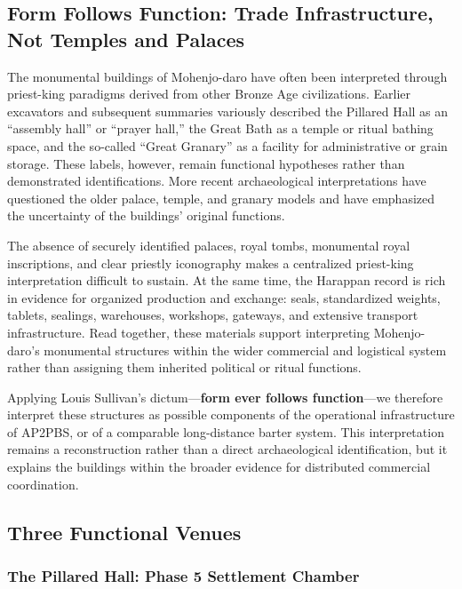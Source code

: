 \documentclass[12pt]{article}
\begin{document}
\subsection{Form Follows Function: Trade Infrastructure, Not Temples and Palaces}

The monumental buildings of Mohenjo-daro have often been interpreted through
priest-king paradigms derived from other Bronze Age civilizations. Earlier
excavators and subsequent summaries variously described the Pillared Hall as an
``assembly hall'' or ``prayer hall,'' the Great Bath as a temple or ritual
bathing space, and the so-called ``Great Granary'' as a facility for
administrative or grain storage. These labels, however, remain functional
hypotheses rather than demonstrated identifications. More recent archaeological
interpretations have questioned the older palace, temple, and granary models
and have emphasized the uncertainty of the buildings' original functions.

The absence of securely identified palaces, royal tombs, monumental royal
inscriptions, and clear priestly iconography makes a centralized priest-king
interpretation difficult to sustain. At the same time, the Harappan record is
rich in evidence for organized production and exchange: seals, standardized
weights, tablets, sealings, warehouses, workshops, gateways, and extensive
transport infrastructure. Read together, these materials support interpreting
Mohenjo-daro's monumental structures within the wider commercial and logistical
system rather than assigning them inherited political or ritual functions.

Applying Louis Sullivan's dictum---\textbf{form ever follows function}---we
therefore interpret these structures as possible components of the operational
infrastructure of AP2PBS, or of a comparable long-distance barter system. This
interpretation remains a reconstruction rather than a direct archaeological
identification, but it explains the buildings within the broader evidence for
distributed commercial coordination.

\subsection{Three Functional Venues}

\subsubsection{The Pillared Hall: Phase 5 Settlement Chamber}
\end{document}
